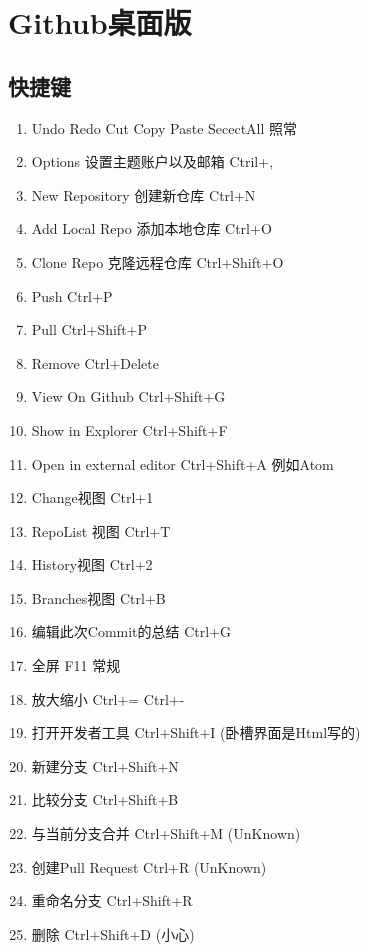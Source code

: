 \documentclass[utf8]{ctexart}
\begin{document}
		\section{Github桌面版}
		\subsection{快捷键}
		\begin{enumerate}
				\item Undo Redo Cut Copy Paste SecectAll 照常
				\item Options 设置主题账户以及邮箱	Ctril+,
				\item New Repository 创建新仓库	Ctrl+N
				\item Add Local Repo 添加本地仓库 Ctrl+O
				\item Clone Repo 克隆远程仓库 Ctrl+Shift+O
				\item Push  Ctrl+P 
				\item Pull Ctrl+Shift+P
				\item Remove Ctrl+Delete
				\item View On Github Ctrl+Shift+G
				\item Show in Explorer Ctrl+Shift+F
				\item Open in external editor Ctrl+Shift+A 例如Atom
				\item Change视图 Ctrl+1
				\item RepoList 视图 Ctrl+T
				\item History视图 Ctrl+2
				\item Branches视图 Ctrl+B
				\item 编辑此次Commit的总结 Ctrl+G
				\item 全屏 F11 常规
				\item 放大缩小 Ctrl+=  Ctrl+-
				\item 打开开发者工具 Ctrl+Shift+I (卧槽界面是Html写的)					 
				\item 新建分支 Ctrl+Shift+N
				\item 比较分支 Ctrl+Shift+B
				\item 与当前分支合并 Ctrl+Shift+M (UnKnown)
				\item 创建Pull Request Ctrl+R (UnKnown)				
				\item 重命名分支 Ctrl+Shift+R 
				\item 删除 Ctrl+Shift+D (小心)		
		\end{enumerate}
			
\end{document}
